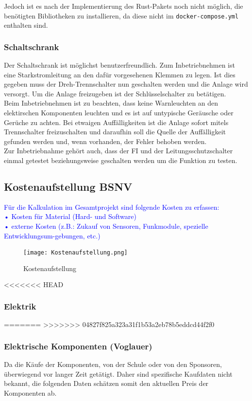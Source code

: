 Jedoch ist es nach der Implementierung des Rust-Pakets noch nicht möglich, die benötigten Bibliotheken zu installieren, da diese nicht im \texttt{docker-compose.yml} enthalten sind. 


\subsubsection{Schaltschrank}
    Der Schaltschrank ist möglichst benutzerfreundlich. Zum Inbetriebnehmen ist eine Starkstromleitung an den dafür vorgesehenen Klemmen zu legen. Ist dies gegeben muss der Dreh-Trennschalter nun geschalten werden und die Anlage wird versorgt. Um die Anlage freizugeben ist der Schlüsselschalter zu betätigen.\\
    Beim Inbetriebnehmen ist zu beachten, dass keine Warnleuchten an den elektirschen Komponenten leuchten und es ist auf untypische Geräusche oder Gerüche zu achten. Bei etwaigen Auffälligkeiten ist die Anlage sofort mitels Trennschalter freizuschalten und daraufhin soll die Quelle der Auffälligkeit gefunden werden und, wenn vorhanden, der Fehler behoben werden.\\
    Zur Inbetriebnahme gehört auch, dass der FI und der Leitungsschutzschalter einmal getestet beziehungsweise geschalten werden um die Funktion zu testen.\\
\newpage
\subsection{Kostenaufstellung BSNV}
\textcolor{blue}{Für die Kalkulation im Gesamtprojekt sind folgende Kosten zu erfassen: \\
•	Kosten für Material (Hard- und Software)\\
•	externe Kosten (z.B.: Zukauf von Sensoren, Funkmodule, spezielle Entwicklungsum-gebungen, etc.) 
}
\begin{figure}[h]
    \texttt{[image: Kostenaufstellung.png]}
    \centering
    \caption{Kostenaufstellung}
\end{figure}


\newpage
<<<<<<< HEAD
\subsubsection{Elektrik}




=======
>>>>>>> 04827f825a323a31f1b53a2eb78b5eddcd44f2f0
\subsubsection{Elektrische Komponenten (Voglauer)}
Da die Käufe der Komponenten, von der Schule oder von den Sponsoren, überwiegend vor langer Zeit getätigt. Daher sind spezifische Kaufdaten nicht bekannt, die folgenden Daten schätzen somit den aktuellen Preis der Komponenten ab.\\ 
